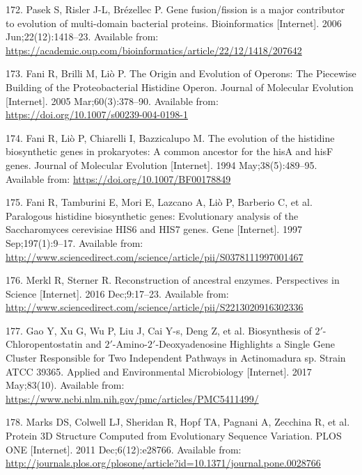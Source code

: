 \documentclass[12pt,twoside]{reedthesis}
\begin{document}
  \hypertarget{ref-pasek_gene_2006}{}
  172. Pasek S, Risler J-L, Brézellec P. Gene fusion/fission is a major
  contributor to evolution of multi-domain bacterial proteins.
  Bioinformatics {[}Internet{]}. 2006 Jun;22(12):1418--23. Available from:
  \url{https://academic.oup.com/bioinformatics/article/22/12/1418/207642}
  
  \hypertarget{ref-fani_origin_2005}{}
  173. Fani R, Brilli M, Liò P. The Origin and Evolution of Operons: The
  Piecewise Building of the Proteobacterial Histidine Operon. Journal of
  Molecular Evolution {[}Internet{]}. 2005 Mar;60(3):378--90. Available
  from: \url{https://doi.org/10.1007/s00239-004-0198-1}
  
  \hypertarget{ref-fani_evolution_1994}{}
  174. Fani R, Liò P, Chiarelli I, Bazzicalupo M. The evolution of the
  histidine biosynthetic genes in prokaryotes: A common ancestor for the
  hisA and hisF genes. Journal of Molecular Evolution {[}Internet{]}. 1994
  May;38(5):489--95. Available from:
  \url{https://doi.org/10.1007/BF00178849}
  
  \hypertarget{ref-fani_paralogous_1997}{}
  175. Fani R, Tamburini E, Mori E, Lazcano A, Liò P, Barberio C, et al.
  Paralogous histidine biosynthetic genes: Evolutionary analysis of the
  Saccharomyces cerevisiae HIS6 and HIS7 genes. Gene {[}Internet{]}. 1997
  Sep;197(1):9--17. Available from:
  \url{http://www.sciencedirect.com/science/article/pii/S0378111997001467}
  
  \hypertarget{ref-merkl_reconstruction_2016}{}
  176. Merkl R, Sterner R. Reconstruction of ancestral enzymes.
  Perspectives in Science {[}Internet{]}. 2016 Dec;9:17--23. Available
  from:
  \url{http://www.sciencedirect.com/science/article/pii/S2213020916302336}
  
  \hypertarget{ref-gao_biosynthesis_2017}{}
  177. Gao Y, Xu G, Wu P, Liu J, Cai Y-s, Deng Z, et al. Biosynthesis of
  \(2\prime\)-Chloropentostatin and
  \(2\prime\)-Amino-\(2\prime\)-Deoxyadenosine Highlights a Single Gene
  Cluster Responsible for Two Independent Pathways in Actinomadura sp.
  Strain ATCC 39365. Applied and Environmental Microbiology
  {[}Internet{]}. 2017 May;83(10). Available from:
  \url{https://www.ncbi.nlm.nih.gov/pmc/articles/PMC5411499/}
  
  \hypertarget{ref-marks_protein_2011}{}
  178. Marks DS, Colwell LJ, Sheridan R, Hopf TA, Pagnani A, Zecchina R,
  et al. Protein 3D Structure Computed from Evolutionary Sequence
  Variation. PLOS ONE {[}Internet{]}. 2011 Dec;6(12):e28766. Available
  from:
  \url{http://journals.plos.org/plosone/article?id=10.1371/journal.pone.0028766}
  
\end{document}
